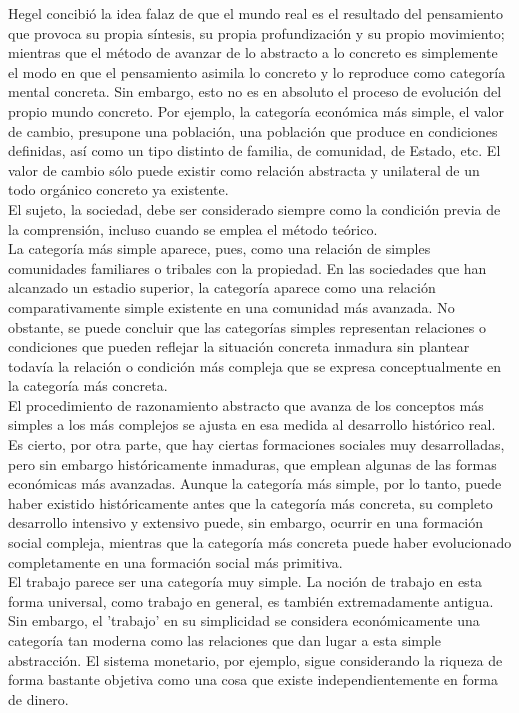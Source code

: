 Hegel concibió la idea falaz de que el mundo real es el resultado del pensamiento que provoca su propia síntesis, su propia profundización y su propio movimiento; mientras que el método de avanzar de lo abstracto a lo concreto es simplemente el modo en que el pensamiento asimila lo concreto y lo reproduce como categoría mental concreta. Sin embargo, esto no es en absoluto el proceso de evolución del propio mundo concreto. Por ejemplo, la categoría económica más simple, el valor de cambio, presupone una población, una población que produce en condiciones definidas, así como un tipo distinto de familia, de comunidad, de Estado, etc. El valor de cambio sólo puede existir como relación abstracta y unilateral de un todo orgánico concreto ya existente.\\

El sujeto, la sociedad, debe ser considerado siempre como la condición previa de la comprensión, incluso cuando se emplea el método teórico.\\

La categoría más simple aparece, pues, como una relación de simples comunidades familiares o tribales con la propiedad. En las sociedades que han alcanzado un estadio superior, la categoría aparece como una relación comparativamente simple existente en una comunidad más avanzada. No obstante, se puede concluir que las categorías simples representan relaciones o condiciones que pueden reflejar la situación concreta inmadura sin plantear todavía la relación o condición más compleja que se expresa conceptualmente en la categoría más concreta.\\
El procedimiento de razonamiento abstracto que avanza de los conceptos más simples a los más complejos se ajusta en esa medida al desarrollo histórico real. \\

Es cierto, por otra parte, que hay ciertas formaciones sociales muy desarrolladas, pero sin embargo históricamente inmaduras, que emplean algunas de las formas económicas más avanzadas. Aunque la categoría más simple, por lo tanto, puede haber existido históricamente antes que la categoría más concreta, su completo desarrollo intensivo y extensivo puede, sin embargo, ocurrir en una formación social compleja, mientras que la categoría más concreta puede haber evolucionado completamente en una formación social más primitiva.\\

El trabajo parece ser una categoría muy simple. La noción de trabajo en esta forma universal, como trabajo en general, es también extremadamente antigua. Sin embargo, el 'trabajo' en su simplicidad se considera económicamente una categoría tan moderna como las relaciones que dan lugar a esta simple abstracción.  El sistema monetario, por ejemplo, sigue considerando la riqueza de forma bastante objetiva como una cosa que existe independientemente en forma de dinero.\\

